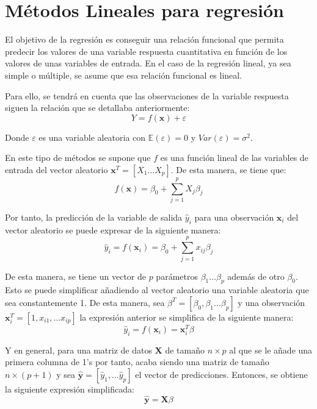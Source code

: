\section{Métodos Lineales para regresión}

\noindent El objetivo de la regresión es conseguir una relación funcional que permita predecir los valores de una variable respuesta cuantitativa en función de los valores de unas variables de entrada. En el caso de la regresión lineal, ya sea simple o múltiple, se asume que esa relación funcional es lineal. 

\noindent Para ello, se tendrá en cuenta que las observaciones de la variable respuesta siguen la relación que se detallaba anteriormente:
\begin{equation}
Y=f(\textbf{x})+\varepsilon
\end{equation}

\noindent Donde $\varepsilon$ es una variable aleatoria con $\mathbb{E}(\varepsilon)=0$ y $Var(\varepsilon)=\sigma^2$.

\noindent En este tipo de métodos se supone que $f$ es una función lineal de las variables de entrada del vector aleatorio $\textbf{x}^T=[X_1\ldots X_p]$. De esta manera, se tiene que:  
\begin{equation}
f(\textbf{x})=\beta_0+\sum_{j=1}^p X_j\beta_j
\end{equation}

\noindent Por tanto, la predicción de la variable de salida $\hat{y
}_i$ para una observación $\textbf{x}_i$ del vector aleatorio  se puede expresar de la siguiente manera:
\begin{equation}
\hat{y}_i=f(\textbf{x}_i)=\beta_0+\sum_{j=1}^p x_{ij}\beta_j
\end{equation}

\noindent De esta manera, se tiene un vector de $p$ parámetros $\beta_1 \ldots \beta_p$ además de otro $\beta_0$. Esto se puede simplificar añadiendo al vector aleatorio una variable aleatoria que sea constantemente 1. De esta manera, sea $\beta^T=[\beta_0,\beta_1\ldots \beta_p]$ y una observación $\textbf{x}_i^T=[1,x_{i1},\ldots x_{ip}]$ la expresión anterior se simplifica de la siguiente manera: 
\begin{equation}
\hat{y}_i= f(\textbf{x}_i)=\textbf{x}_i^T\beta
\end{equation}

\noindent Y en general, para una matriz de datos $\textbf{X}$ de tamaño $n\times p $ al que se le añade una primera columna de 1's por tanto, acaba siendo una matriz de tamaño $n\times (p+1)$ y sea $\hat{\textbf{y}}=[\hat{y}_1,\ldots \hat{y}_p]$ el vector de predicciones. Entonces, se obtiene la siguiente expresión  simplificada:
\begin{equation}
\hat{\textbf{y}}=\textbf{X}\beta
\end{equation} 

